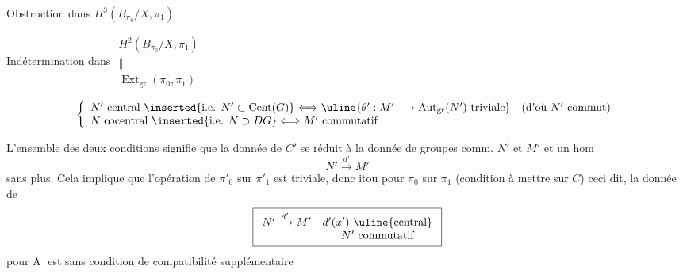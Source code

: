 Obstruction dans $H^3(B_{\pi_0}/X,\pi_1)$

Indétermination dans $\begin{array}{c}H^2(B_{\pi_0}/X,\pi_1)\\ \Vert\\ \operatorname{Ext}_{\mathrm{gr}}(\pi_0,\pi_1)\end{array}$

\hrulefill

\[
\left\{\begin{array}{l}
N'\text{ central}\ \inserted{\text{i.e. }N'\subset\operatorname{Cent}(G)}
\Longleftrightarrow\uline{\theta':M'\longrightarrow\operatorname{Aut}_{\mathrm{gr}}(N')\text{ triviale}}\quad(\text{d'où }N'\text{ commut})\\
N\text{ cocentral}\ \inserted{\text{i.e. }N\supset DG}\Longleftrightarrow M'\text{ commutatif}
\end{array}\right.
\]

L'ensemble des deux conditions signifie que
la donnée de $C'$ se réduit à la donnée
de groupes comm. $N'$ et $M'$ et un
hom
\[
N'\xrightarrow{d'}M'
\]
sans plus. Cela implique que l'opération
de $\pi'_0$ sur $\pi'_1$ est triviale, donc itou pour
$\pi_0$ sur $\pi_1$ (condition à mettre sur $C$)
ceci dit, la donnée de
\[
\boxed{\begin{array}{cc}N'\xrightarrow{d'}M'&d'(x')\text{ \uline{central}}\\&N'\text{ commutatif}\end{array}}
\]
pour \textcircled{A} est sans condition
de compatibilité supplémentaire

